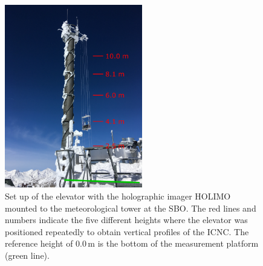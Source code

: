 \documentclass[draft,linenumbers]{agujournal}
\begin{document}
\begin{figure}[t]
 \centering
 	\includegraphics[width=6cm]{tower.png}
 \caption{Set up of the elevator with the holographic imager HOLIMO mounted to the meteorological tower at the SBO. The red lines and numbers indicate the five different heights where the elevator was positioned repeatedly to obtain vertical profiles of the ICNC. The reference height of 0.0\,\si{m} is the bottom of the measurement platform (green line).}
 \label{fig:Elevator}
\end{figure}
\end{document}
